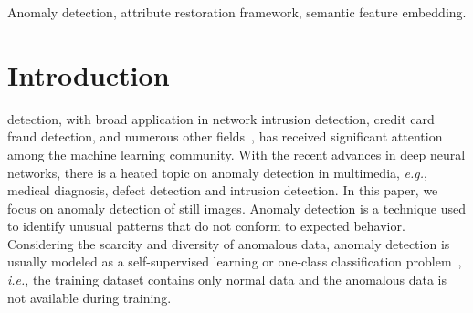 \documentclass[journal]{IEEEtran}
\begin{document}
\begin{IEEEkeywords}
Anomaly detection, attribute restoration framework, semantic feature embedding.
\end{IEEEkeywords}

\IEEEpeerreviewmaketitle

\section{Introduction}
 detection, with broad application in network intrusion detection, credit card fraud detection, and numerous other fields~\cite{chandola2009anomaly}, has received significant attention among the machine learning community. 
With the recent advances in deep neural networks, there is a heated topic on anomaly detection in multimedia, \emph{e.g.}, medical diagnosis, defect detection and intrusion detection. In this paper, we focus on anomaly detection of still images.
Anomaly detection is a technique used to identify unusual patterns that do not conform to expected behavior.
Considering the scarcity and diversity of anomalous data, anomaly detection is usually modeled as a self-supervised learning or one-class classification problem~\cite{ruff2018deep}, \emph{i.e.}, the training dataset contains only normal data and the anomalous data is not available during training.
\end{document}
